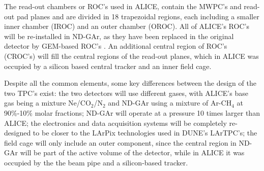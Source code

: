 The read-out chambers or ROC's used in ALICE, contain the MWPC's and read-out pad planes and are divided in 18 trapezoidal regions, each including a smaller inner chamber (IROC) and an outer chamber (OROC). All of ALICE's ROC's will be re-installed in ND-GAr, as they have been replaced in the original detector by GEM-based ROC's \cite{Ferretti:2022yjd}. An additional central region of ROC's (CROC's) will fill the central regions of the read-out planes, which in ALICE was occupied by a silicon based central tracker and an inner field cage. 

Despite all the common elements, some key differences between the design of the two TPC's exist: the two detectors will use different gases, with ALICE's base gas being a mixture Ne/CO$_2$/N$_2$ and ND-GAr using a mixture of Ar-CH$_4$ at 90\%-10\% molar fractions; ND-GAr will operate at a pressure 10 times larger than ALICE; the electronics and data acquisition systems will be completely re-designed to be closer to the LArPix technologies used in DUNE's LArTPC's; the field cage will only include an outer component, since the central region in ND-GAr will be part of the active volume of the detector, while in ALICE it was occupied by the the beam pipe and a silicon-based tracker.
